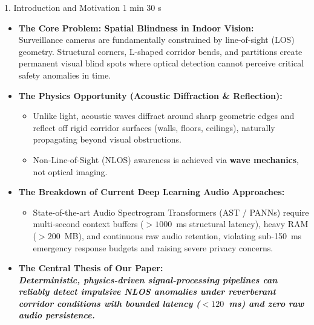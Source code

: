 \documentclass[aspectratio=169,10pt]{beamer}
\begin{document}
\begin{frame}{1. Introduction and Motivation \hfill {\small\color{gray}1 min 30 s}}
\begin{itemize}
    \setlength{\itemsep}{0.6em}
    \item \textbf{The Core Problem: Spatial Blindness in Indoor Vision:} \\
    Surveillance cameras are fundamentally constrained by line-of-sight (LOS) geometry. Structural corners, L-shaped corridor bends, and partitions create permanent visual blind spots where optical detection cannot perceive critical safety anomalies in time.
    
    \item \textbf{The Physics Opportunity (Acoustic Diffraction \& Reflection):}
    \begin{itemize}
        \item Unlike light, acoustic waves diffract around sharp geometric edges and reflect off rigid corridor surfaces (walls, floors, ceilings), naturally propagating beyond visual obstructions.
        \item Non-Line-of-Sight (NLOS) awareness is achieved via \textbf{wave mechanics}, not optical imaging.
    \end{itemize}
    
    \item \textbf{The Breakdown of Current Deep Learning Audio Approaches:}
    \begin{itemize}
        \item State-of-the-art Audio Spectrogram Transformers (AST / PANNs) require multi-second context buffers ($>1000$~ms structural latency), heavy RAM ($>200$~MB), and continuous raw audio retention, violating sub-150~ms emergency response budgets and raising severe privacy concerns.
    \end{itemize}
    
    \item \textbf{The Central Thesis of Our Paper:} \\
    \textit{\textbf{Deterministic, physics-driven signal-processing pipelines can reliably detect impulsive NLOS anomalies under reverberant corridor conditions with bounded latency ($<120$~ms) and zero raw audio persistence.}}
\end{itemize}
\end{frame}
\end{document}
